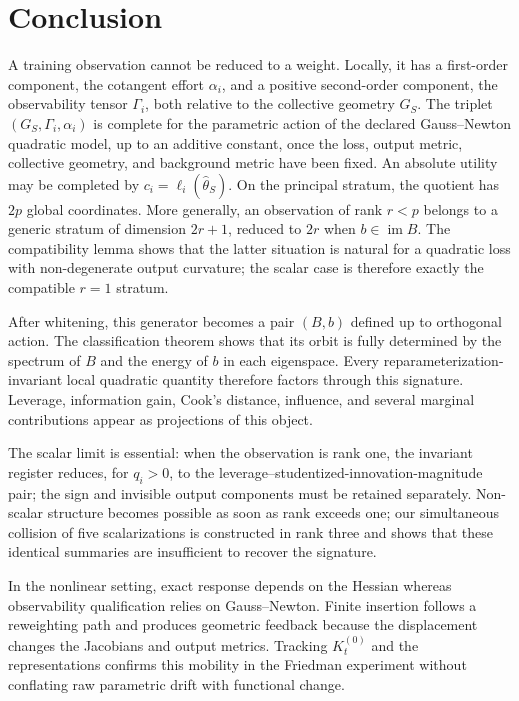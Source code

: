 \documentclass[10pt,a4paper]{article}
\newcommand{\Img}{\operatorname{im}}
\begin{document}
\section{Conclusion}
A training observation cannot be reduced to a weight. Locally, it has a first-order component, the cotangent effort $\alpha_i$, and a positive second-order component, the observability tensor $\Gamma_i$, both relative to the collective geometry $G_S$. The triplet $(G_S,\Gamma_i,\alpha_i)$ is complete for the parametric action of the declared Gauss--Newton quadratic model, up to an additive constant, once the loss, output metric, collective geometry, and background metric have been fixed. An absolute utility may be completed by $c_i=\ell_i(\widehat\theta_S)$. On the principal stratum, the quotient has $2p$ global coordinates. More generally, an observation of rank $r<p$ belongs to a generic stratum of dimension $2r+1$, reduced to $2r$ when $b\in\Img B$. The compatibility lemma shows that the latter situation is natural for a quadratic loss with non-degenerate output curvature; the scalar case is therefore exactly the compatible $r=1$ stratum.

After whitening, this generator becomes a pair $(B,b)$ defined up to orthogonal action. The classification theorem shows that its orbit is fully determined by the spectrum of $B$ and the energy of $b$ in each eigenspace. Every reparameterization-invariant local quadratic quantity therefore factors through this signature. Leverage, information gain, Cook's distance, influence, and several marginal contributions appear as projections of this object.

The scalar limit is essential: when the observation is rank one, the invariant register reduces, for $q_i>0$, to the leverage--studentized-innovation-magnitude pair; the sign and invisible output components must be retained separately. Non-scalar structure becomes possible as soon as rank exceeds one; our simultaneous collision of five scalarizations is constructed in rank three and shows that these identical summaries are insufficient to recover the signature.

In the nonlinear setting, exact response depends on the Hessian whereas observability qualification relies on Gauss--Newton. Finite insertion follows a reweighting path and produces geometric feedback because the displacement changes the Jacobians and output metrics. Tracking $K_t^{(0)}$ and the representations confirms this mobility in the Friedman experiment without conflating raw parametric drift with functional change.
\end{document}
